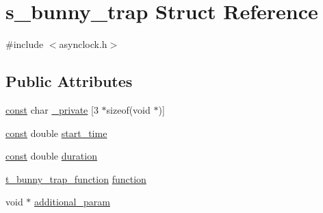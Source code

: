 \hypertarget{structs__bunny__trap}{\section{s\-\_\-bunny\-\_\-trap Struct Reference}
\label{structs__bunny__trap}
}


{\ttfamily \#include $<$asynclock.\-h$>$}

\subsection*{Public Attributes}
\begin{DoxyCompactItemize}
\item 
\hyperlink{term__entry_8h_a57bd63ce7f9a353488880e3de6692d5a}{const} char \hyperlink{structs__bunny__trap_a223a918d48ed1f278abf866a7e2e6341}{\-\_\-private} \mbox{[}3 $\ast$sizeof(void $\ast$)\mbox{]}
\item 
\hyperlink{term__entry_8h_a57bd63ce7f9a353488880e3de6692d5a}{const} double \hyperlink{structs__bunny__trap_a390932ff9cccdaecbd59d7deeea799fc}{start\-\_\-time}
\item 
\hyperlink{term__entry_8h_a57bd63ce7f9a353488880e3de6692d5a}{const} double \hyperlink{structs__bunny__trap_af765e331f28bf266f0658a68a6db11c0}{duration}
\item 
\hyperlink{asynclock_8h_a274714d28267198e48f559ec76a57309}{t\-\_\-bunny\-\_\-trap\-\_\-function} \hyperlink{structs__bunny__trap_a64f65a9acb21bf8cc0e9286e31ef232c}{function}
\item 
void $\ast$ \hyperlink{structs__bunny__trap_a31db59a57f2d5ceddace87d922db63de}{additional\-\_\-param}
\end{DoxyCompactItemize}


